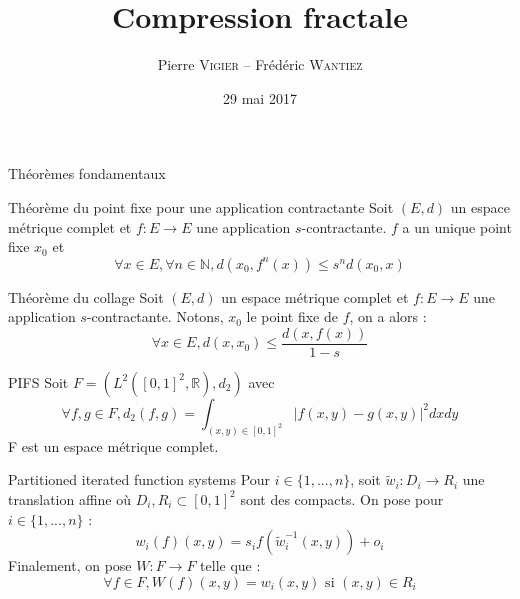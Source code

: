 \documentclass{beamer}
\title{Compression fractale}
\author{Pierre \textsc{Vigier} -- Frédéric \textsc{Wantiez}}
\institute{CentraleSupélec}
\date{29 mai 2017}
\begin{document}
\begin{frame}
\titlepage
\end{frame}

\begin{frame}{Théorèmes fondamentaux}
\begin{block}{Théorème du point fixe pour une application contractante}
Soit $(E, d)$ un espace métrique complet et $f : E \rightarrow E$ une application $s$-contractante. $f$ a un unique point fixe $x_0$ et
$$\forall x \in E, \forall n \in \mathbb{N}, d(x_0, f^n(x)) \leq s^n d(x_0, x)$$
\end{block}

\begin{block}{Théorème du collage}
Soit $(E, d)$ un espace métrique complet et $f : E \rightarrow E$ une application $s$-contractante. Notons, $x_0$ le point fixe de $f$, on a alors :
$$\forall x \in E, d(x, x_0) \leq \frac{d(x, f(x))}{1-s}$$
\end{block}
\end{frame}

\begin{frame}{PIFS}
Soit $F = (L^2([0, 1]^2, \mathbb{R}), d_2)$ avec
$$\forall f, g \in F, d_2(f, g) = \int_{(x,y) \in [0, 1]^2}{|f(x, y) - g(x, y)|^2dxdy}$$
F est un espace métrique complet.
\begin{block}{Partitioned iterated function systems}
Pour $i \in \{1, ..., n\}$, soit $\tilde{w}_i : D_i \rightarrow R_i$ une translation affine où $D_i, R_i \subset [0, 1]^2$ sont des compacts. On pose pour $i \in \{1, ..., n\}$ :
$$w_i(f)(x, y) = s_i f(\tilde{w}^{-1}_i(x, y)) + o_i$$
Finalement, on pose $W : F \rightarrow F$ telle que :
$$\forall f \in F, W(f)(x, y) = w_i(x, y) \text{ si } (x, y) \in R_i$$
\end{block}
\end{frame}
\end{document}
